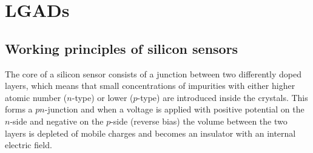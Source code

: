 \chapter{LGADs} 


\section{Working principles of silicon sensors}

The core of a silicon sensor consists of a junction between two differently doped layers, which means that small concentrations of impurities with either higher atomic number ($n$-type) or lower ($p$-type) are introduced inside the crystals.
This forms a $pn$-junction and when a voltage is applied with positive potential on the $n$-side and negative on the $p$-side (reverse bias) the volume between the two layers is depleted of mobile charges and becomes an insulator with an internal electric field.



